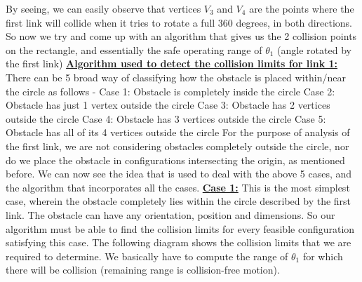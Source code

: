 \documentclass[12pt]{article}
\begin{document}
By seeing, we can easily observe that vertices $V_3$ and $V_4$ are the points where the first link will collide when it tries to rotate a full 360 degrees, in both directions. So now we try and come up with an algorithm that gives us the 2 collision points on the rectangle, and essentially the safe operating range of $\theta_1$ (angle rotated by the first link)
\clearpage
\underline{\textbf{Algorithm used to detect the collision limits for link 1:}}
\newline
\newline
There can be 5 broad way of classifying how the obstacle is placed within/near the circle as follows - 
\newline
Case 1: Obstacle is completely inside the circle
\newline
Case 2: Obstacle has just 1 vertex outside the circle
\newline
Case 3: Obstacle has 2 vertices outside the circle
\newline
Case 4: Obstacle has 3 vertices outside the circle
\newline
Case 5: Obstacle has all of its 4 vertices outside the circle
\newline
For the purpose of analysis of the first link, we are not considering obstacles completely outside the circle, nor do we place the obstacle in configurations intersecting the origin, as mentioned before. We can now see the idea that is used to deal with the above 5 cases, and the algorithm that incorporates all the cases.
\newline
\newline
\underline{\textbf{Case 1:}}
\newline
This is the most simplest case, wherein the obstacle completely lies within the circle described by the first link. The obstacle can have any orientation, position and dimensions. So our algorithm must be able to find the collision limits for every feasible configuration satisfying this case. The following diagram shows the collision limits that we are required to determine. We basically have to compute the range of $\theta_1$ for which there will be collision (remaining range is collision-free motion).
\end{document}
